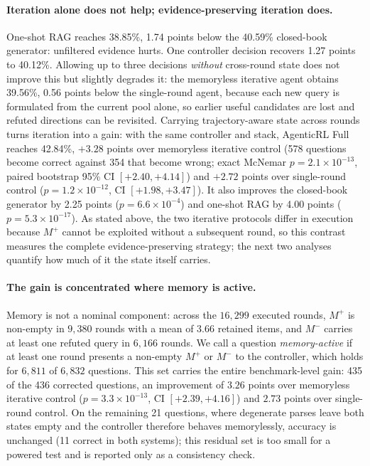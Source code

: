 \paragraph{Iteration alone does not help; evidence-preserving iteration does.}
One-shot RAG reaches 38.85\%, 1.74 points below the 40.59\% closed-book
generator: unfiltered evidence hurts. One controller decision recovers 1.27
points to 40.12\%. Allowing up to three decisions \emph{without} cross-round
state does not improve this but slightly degrades it: the memoryless iterative
agent obtains 39.56\%, 0.56 points below the single-round agent, because each
new query is formulated from the current pool alone, so earlier useful
candidates are lost and refuted directions can be revisited. Carrying
trajectory-aware state across rounds turns iteration into a gain: with the same
controller and stack, AgenticRL Full reaches 42.84\%, $+3.28$ points over
memoryless iterative control (578 questions become correct against 354 that
become wrong; exact McNemar $p=2.1\times10^{-13}$, paired bootstrap 95\% CI
$[+2.40,+4.14]$) and $+2.72$ points over single-round control
($p=1.2\times10^{-12}$, CI $[+1.98,+3.47]$). It also improves the closed-book
generator by 2.25 points ($p=6.6\times10^{-4}$) and one-shot RAG by 4.00 points
($p=5.3\times10^{-17}$). As stated above, the two iterative protocols differ in
execution because $M^+$ cannot be exploited without a subsequent round, so this
contrast measures the complete evidence-preserving strategy; the next two
analyses quantify how much of it the state itself carries.

\paragraph{The gain is concentrated where memory is active.}
Memory is not a nominal component: across the $16{,}299$ executed rounds, $M^+$
is non-empty in $9{,}380$ rounds with a mean of $3.66$ retained items, and
$M^-$ carries at least one refuted query in $6{,}166$ rounds. We call a question
\emph{memory-active} if at least one round presents a non-empty $M^+$ or $M^-$
to the controller, which holds for $6{,}811$ of $6{,}832$ questions. This set
carries the entire benchmark-level gain: 435 of the 436 corrected questions, an
improvement of $3.26$ points over memoryless iterative control
($p=3.3\times10^{-13}$, CI $[+2.39,+4.16]$) and $2.73$ points over single-round
control. On the remaining 21 questions, where degenerate parses leave both
states empty and the controller therefore behaves memorylessly, accuracy is
unchanged (11 correct in both systems); this residual set is too small for a
powered test and is reported only as a consistency check.

